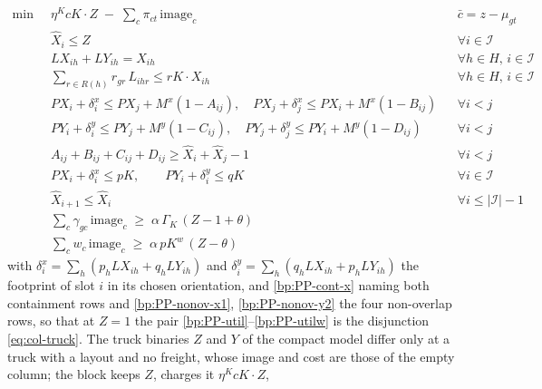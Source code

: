 \begin{align}
  \min\;\; & \eta^{K}cK\cdot Z \;-\; \sum_{c}\pi_{ct}\,\mathrm{image}_{c}
    && \bar c = z-\mu_{gt} \label{bp:PP-objective}\\
  & \widehat{X}_{i} \le Z && \forall i \in \mathcal{I} \label{bp:PP-slot-active}\\
  & \mathit{LX}_{ih} + \mathit{LY}_{ih} = X_{ih}
    && \forall h \in H,\, i \in \mathcal{I} \label{bp:PP-orient}\\
  & \sum_{r \in R(h)} r_{gr}\,L_{ihr} \le \mathit{rK}\cdot X_{ih}
    && \forall h \in H,\, i \in \mathcal{I} \label{bp:PP-height}\\
  & \mathit{PX}_{i} + \delta^{x}_{i} \le \mathit{PX}_{j} + M^{x}(1-A_{ij}),
    \quad
    \mathit{PX}_{j} + \delta^{x}_{j} \le \mathit{PX}_{i} + M^{x}(1-B_{ij})
    && \forall i<j \label{bp:PP-nonov-x1}\\
  & \mathit{PY}_{i} + \delta^{y}_{i} \le \mathit{PY}_{j} + M^{y}(1-C_{ij}),
    \quad
    \mathit{PY}_{j} + \delta^{y}_{j} \le \mathit{PY}_{i} + M^{y}(1-D_{ij})
    && \forall i<j \label{bp:PP-nonov-y2}\\
  & A_{ij}+B_{ij}+C_{ij}+D_{ij} \ge \widehat{X}_{i}+\widehat{X}_{j}-1
    && \forall i<j \label{bp:PP-cover}\\
  & \mathit{PX}_{i} + \delta^{x}_{i} \le \mathit{pK},
    \qquad
    \mathit{PY}_{i} + \delta^{y}_{i} \le \mathit{qK}
    && \forall i \in \mathcal{I} \label{bp:PP-cont-x}\\
  & \widehat{X}_{i+1} \le \widehat{X}_{i}
    && \forall i \le |\mathcal{I}|-1 \label{bp:PP-sym}\\
  & \sum_{c}\gamma_{gc}\,\mathrm{image}_{c}
      \;\ge\;\alpha\,\Gamma_{K}\,(Z-1+\theta) \label{bp:PP-util}\\
  & \sum_{c} w_{c}\,\mathrm{image}_{c}
      \;\ge\;\alpha\,\mathit{pK}^{w}\,(Z-\theta) \label{bp:PP-utilw}
\end{align}
with $\delta^{x}_{i}=\sum_{h}(p_{h}\mathit{LX}_{ih}+q_{h}\mathit{LY}_{ih})$
and $\delta^{y}_{i}=\sum_{h}(q_{h}\mathit{LX}_{ih}+p_{h}\mathit{LY}_{ih})$
the footprint of slot $i$ in its chosen orientation, and
\eqref{bp:PP-cont-x} naming both containment rows and
\eqref{bp:PP-nonov-x1}, \eqref{bp:PP-nonov-y2} the four non-overlap
rows, so that at $Z=1$ the pair
\eqref{bp:PP-util}--\eqref{bp:PP-utilw} is the disjunction
\eqref{eq:col-truck}.
The truck binaries $Z$ and $Y$ of the compact model differ only at a
truck with a layout and no freight, whose image and cost are those of
the empty column; the block keeps $Z$, charges it $\eta^{K}cK\cdot Z$,
